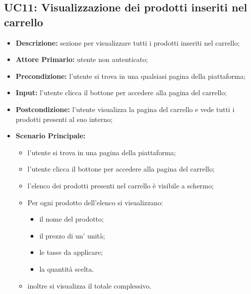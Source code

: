 \subsection{UC11: Visualizzazione dei prodotti inseriti nel carrello}
\label{sec:UC11}
\begin{itemize}
    \item \textbf{Descrizione:} sezione per visualizzare tutti i prodotti inseriti nel carrello;
    \item \textbf{Attore Primario:} utente non autenticato;
    \item \textbf{Precondizione:}  l'utente si trova in una qualsiasi pagina della piattaforma;
    \item \textbf{Input:} l'utente clicca il bottone per accedere alla pagina del carrello;
    \item \textbf{Postcondizione:} l'utente visualizza la pagina del carrello e vede tutti i prodotti presenti al suo interno;
    \item \textbf{Scenario Principale:}
          \begin{itemize}
              \item l'utente si trova in una pagina della piattaforma;
              \item l'utente clicca il bottone per accedere alla pagina del carrello;
              \item l'elenco dei prodotti presenti nel carrello è visibile a schermo;
              \item Per ogni prodotto dell'elenco si visualizzano:
              \begin{itemize}
                  \item il nome del prodotto;
                  \item il prezzo di un' unità;
                  \item le tasse da applicare;
                  \item la quantità scelta.
              \end{itemize}
              \item inoltre si visualizza il totale complessivo.
          \end{itemize}
\end{itemize}